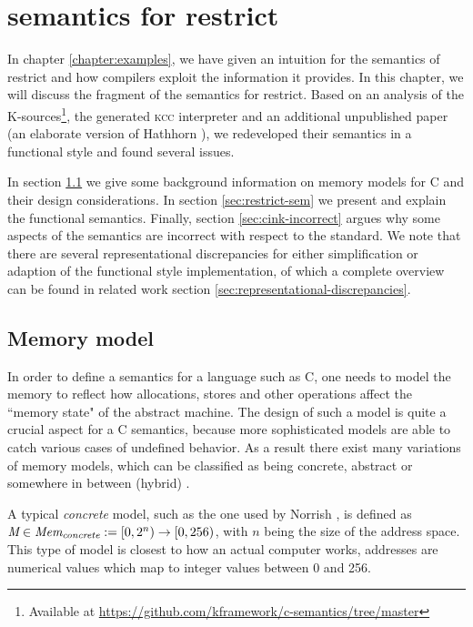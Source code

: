 \chapter{\cink{} semantics for restrict}\label{chap:cink}
In chapter \ref{chapter:examples}, we have given an intuition for the semantics of restrict and how
compilers exploit the information it provides.
In this chapter, we will discuss the fragment of the \cink{} semantics for restrict.
Based on an analysis of the K-sources\footnote{Available at \url{https://github.com/kframework/c-semantics/tree/master}}, the generated \textsc{kcc} interpreter
and an additional unpublished paper (an elaborate version of Hathhorn \etall \cite{hathhorn2015defining}), we redeveloped their semantics in a functional style and found
several issues.

In section \ref{sec:memory-model} we give some background information on memory models for C and their design considerations.
In section \ref{sec:restrict-sem} we present and explain the functional \cink{} semantics.
Finally, section \ref{sec:cink-incorrect} argues why some aspects of the semantics are incorrect
with respect to the standard.
We note that there are several representational discrepancies for either simplification or adaption 
of the functional style implementation, of which a complete overview can be found in related work section \ref{sec:representational-discrepancies}. 

\section{Memory model}\label{sec:memory-model}
In order to define a semantics for a language such as C, one needs to model the memory to reflect how allocations, stores and other operations affect the ``memory state" of the abstract machine.
The design of such a model is quite a crucial aspect for a C semantics, because more sophisticated models are able to catch various cases of undefined behavior.
As a result there exist many variations of memory models, which can be classified as being concrete, abstract or somewhere in between (hybrid) \cite{leroy2008formal, memarian2019exploring}.

A typical \textit{concrete} model, such as the one used by Norrish \cite{norrish1998c}, is defined as $\textit{M} \in \textit{Mem}_\textit{concrete} := [0, 2^n) \rightarrow [0, 256)$,
with $n$ being the size of the address space.
This type of model is closest to how an actual computer works, \ie addresses are numerical values which map to integer values
between 0 and 256.

